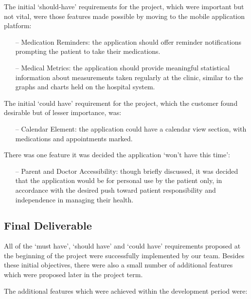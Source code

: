 \documentclass{l3proj}
\begin{document}
The initial `should-have' requirements for the project, which were important but not vital, were those features made possible by moving to the mobile application platform:

\begin{itemize}
\item[--]Medication Reminders: the application should offer reminder notifications prompting the patient to take their medications.

\item[--]Medical Metrics: the application should provide meaningful statistical information about measurements taken regularly at the clinic, similar to the graphs and charts held on the hospital system.
\end{itemize}

The initial `could have' requirement for the project, which the customer found desirable but of lesser importance, was:

\begin{itemize}
\item[--]Calendar Element: the application could have a calendar view section, with medications and appointments marked.
\end{itemize}

There was one feature it was decided the application `won't have this time':

\begin{itemize}
\item[--]Parent and Doctor Accessibility: though briefly discussed, it was decided that the application would be for personal use by the patient only, in accordance with the desired push toward patient responsibility and independence in managing their health.
\end{itemize}


\subsection{Final Deliverable} \label{sec:2.4}
All of the `must have', `should have' and `could have' requirements proposed at the beginning of the project were successfully implemented by our team. Besides these initial objectives, there were also a small number of additional features which were proposed later in the project term.

The additional features which were achieved within the development period were:
\end{document}
